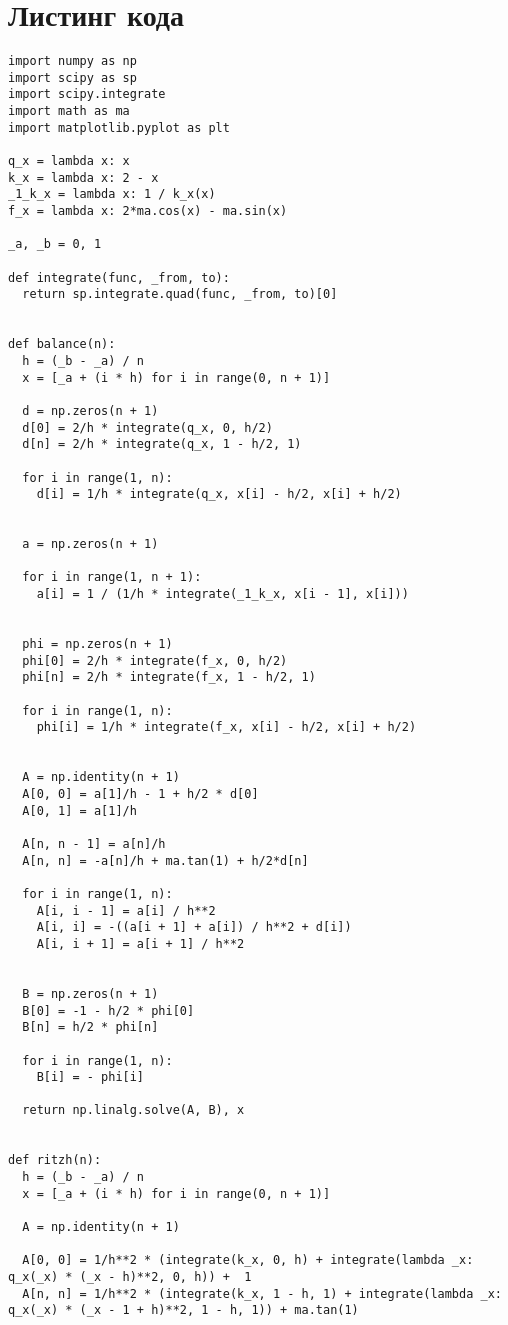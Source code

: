 \documentclass[12pt]{article}
\makeatletter
\newcommand{\verbatimfont}[1]{\renewcommand{\verbatim@font}{\ttfamily#1}}
\makeatother
\begin{document}
\section{Листинг кода}
\verbatimfont{\small}
\begin{verbatim}import numpy as np
import scipy as sp
import scipy.integrate
import math as ma
import matplotlib.pyplot as plt

q_x = lambda x: x
k_x = lambda x: 2 - x
_1_k_x = lambda x: 1 / k_x(x)
f_x = lambda x: 2*ma.cos(x) - ma.sin(x)

_a, _b = 0, 1

def integrate(func, _from, to):
  return sp.integrate.quad(func, _from, to)[0]


def balance(n):
  h = (_b - _a) / n
  x = [_a + (i * h) for i in range(0, n + 1)]

  d = np.zeros(n + 1)
  d[0] = 2/h * integrate(q_x, 0, h/2)
  d[n] = 2/h * integrate(q_x, 1 - h/2, 1)

  for i in range(1, n):
    d[i] = 1/h * integrate(q_x, x[i] - h/2, x[i] + h/2)


  a = np.zeros(n + 1)

  for i in range(1, n + 1):
    a[i] = 1 / (1/h * integrate(_1_k_x, x[i - 1], x[i]))


  phi = np.zeros(n + 1)
  phi[0] = 2/h * integrate(f_x, 0, h/2)
  phi[n] = 2/h * integrate(f_x, 1 - h/2, 1)

  for i in range(1, n):
    phi[i] = 1/h * integrate(f_x, x[i] - h/2, x[i] + h/2)


  A = np.identity(n + 1)
  A[0, 0] = a[1]/h - 1 + h/2 * d[0]
  A[0, 1] = a[1]/h

  A[n, n - 1] = a[n]/h
  A[n, n] = -a[n]/h + ma.tan(1) + h/2*d[n]

  for i in range(1, n):
    A[i, i - 1] = a[i] / h**2
    A[i, i] = -((a[i + 1] + a[i]) / h**2 + d[i])
    A[i, i + 1] = a[i + 1] / h**2


  B = np.zeros(n + 1)
  B[0] = -1 - h/2 * phi[0]
  B[n] = h/2 * phi[n]

  for i in range(1, n):
    B[i] = - phi[i]

  return np.linalg.solve(A, B), x


def ritzh(n):
  h = (_b - _a) / n
  x = [_a + (i * h) for i in range(0, n + 1)]

  A = np.identity(n + 1)

  A[0, 0] = 1/h**2 * (integrate(k_x, 0, h) + integrate(lambda _x: q_x(_x) * (_x - h)**2, 0, h)) +  1
  A[n, n] = 1/h**2 * (integrate(k_x, 1 - h, 1) + integrate(lambda _x: q_x(_x) * (_x - 1 + h)**2, 1 - h, 1)) + ma.tan(1)


\end{verbatim}
\end{document}
